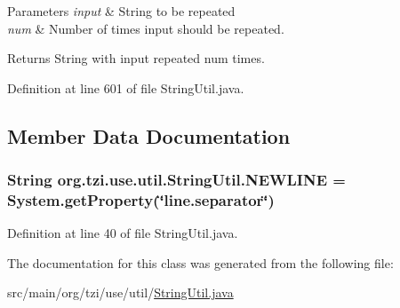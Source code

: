 \begin{DoxyParams}{Parameters}
{\em input} & String to be repeated \\
\hline
{\em num} & Number of times {\ttfamily input} should be repeated. \\
\hline
\end{DoxyParams}
\begin{DoxyReturn}{Returns}
String with {\ttfamily input} repeated {\ttfamily num} times. 
\end{DoxyReturn}


Definition at line 601 of file String\-Util.\-java.



\subsection{Member Data Documentation}
\hypertarget{classorg_1_1tzi_1_1use_1_1util_1_1_string_util_afc0a72ecb58655d358e4ac44e4528562}{
\subsubsection[{N\-E\-W\-L\-I\-N\-E}]{\setlength{\rightskip}{0pt plus 5cm}String org.\-tzi.\-use.\-util.\-String\-Util.\-N\-E\-W\-L\-I\-N\-E = System.\-get\-Property(\char`\"{}line.\-separator\char`\"{})\hspace{0.3cm}{\ttfamily [static]}}}\label{classorg_1_1tzi_1_1use_1_1util_1_1_string_util_afc0a72ecb58655d358e4ac44e4528562}


Definition at line 40 of file String\-Util.\-java.



The documentation for this class was generated from the following file\-:\begin{DoxyCompactItemize}
\item 
src/main/org/tzi/use/util/\hyperlink{_string_util_8java}{String\-Util.\-java}\end{DoxyCompactItemize}

